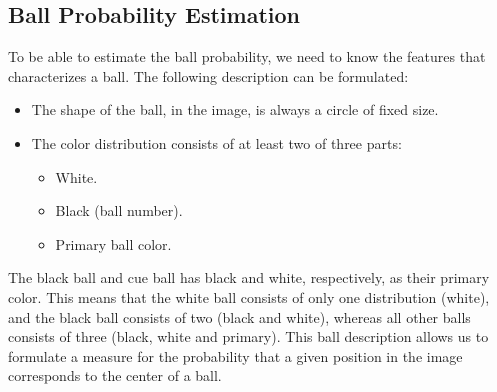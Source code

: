 \subsection{Ball Probability Estimation}
To be able to estimate the ball probability, we need to know the features that characterizes a ball. The following description can be formulated:
\begin{itemize}
\item The shape of the ball, in the image, is always a circle of fixed size.
\item The color distribution consists of at least two of three parts:
	\begin{itemize}
		\item White.
		\item Black (ball number).
		\item Primary ball color.
	\end{itemize}
\end{itemize}
The black ball and cue ball has black and white, respectively, as their primary color. This means that the white ball consists of only one distribution (white), and the black ball consists of two (black and white), whereas all other balls consists of three (black, white and primary). This ball description allows us to formulate a measure for the probability that a given position in the image corresponds to the center of a ball.


